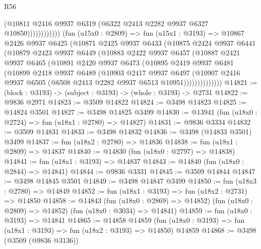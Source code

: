 \begin{lexlean}{R56}
\begin{coremodule}
                            (@10811
                              @2416
                              @9937
                              @6319
                              (@6322 @2413 @2282 @9937 @6327 @10850))))))))))))
        (fun (u15x0 : @2809) =>
        fun (u15x1 : @3193) =>
        @10867
          @2426
          @9937
          @6425
          (@10871
            @2425
            @9937
            @6433
            (@10875
              @2424
              @9937
              @6441
              (@10879
                @2423
                @9937
                @6449
                (@10883
                  @2422
                  @9937
                  @6457
                  (@10887
                    @2421
                    @9937
                    @6465
                    (@10891
                      @2420
                      @9937
                      @6473
                      (@10895
                        @2419
                        @9937
                        @6481
                        (@10899
                          @2418
                          @9937
                          @6489
                          (@10903
                            @2417
                            @9937
                            @6497
                            (@10907
                              @2416
                              @9937
                              @6505
                              (@6508 @2413 @2282 @9937 @6513 @10951))))))))))))))
@14821 := (block : @3193) -> (subject : @3193) -> (whole : @3193) -> @2731
@14822 := @9836 @2971
@14823 := @3509 @14822
@14824 := @3498 @14823
@14825 := @14824 @3501
@14827 := @3498 @14825 @3499
@14830 := @13941 (fun (u18x0 : @2724) => fun (u18x1 : @2780) => @14827)
@14831 := @9836 @3334
@14832 := @3509 @14831
@14833 := @3498 @14832
@14836 := @3498 (@14833 @3501) @3499
@14837 := fun (u18x2 : @2780) => @14836
@14838 := fun (u18x1 : @2809) => @14837
@14840 := @14830 (fun (u18x0 : @2797) => @14838)
@14841 := fun (u18x1 : @3193) => @14837
@14843 := @14840 (fun (u18x0 : @2844) => @14841)
@14844 := @9836 @3331
@14845 := @3509 @14844
@14847 := @3498 @14845 @3501
@14849 := @3498 @14847 @3499
@14850 := fun (u18x3 : @2780) => @14849
@14852 := fun (u18x1 : @3193) => fun (u18x2 : @2731) => @14850
@14858 := @14843
    (fun (u18x0 : @2869) => @14852)
    (fun (u18x0 : @2809) => @14852)
    (fun (u18x0 : @3034) => @14841)
@14859 := fun (u18x0 : @3193) => @14841
@14865 := @14858
    @14859
    (fun (u18x0 : @3193) => fun (u18x1 : @3193) => fun (u18x2 : @3193) => @14850)
    @14859
@14868 := @3498 (@3509 (@9836 @3136))

\end{coremodule}
\end{lexlean}
